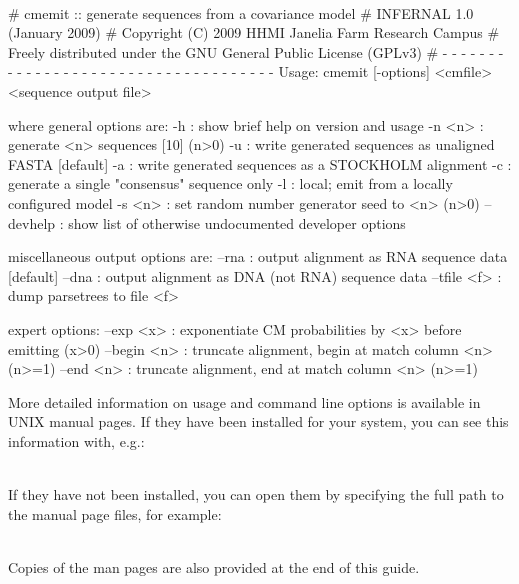 \\

\begin{sreoutput}
# cmemit :: generate sequences from a covariance model
# INFERNAL 1.0 (January 2009)
# Copyright (C) 2009 HHMI Janelia Farm Research Campus
# Freely distributed under the GNU General Public License (GPLv3)
# - - - - - - - - - - - - - - - - - - - - - - - - - - - - - - - - - - - -
Usage: cmemit [-options] <cmfile> <sequence output file>

where general options are:
  -h        : show brief help on version and usage
  -n <n>    : generate <n> sequences  [10]  (n>0)
  -u        : write generated sequences as unaligned FASTA  [default]
  -a        : write generated sequences as a STOCKHOLM alignment
  -c        : generate a single "consensus" sequence only
  -l        : local; emit from a locally configured model
  -s <n>    : set random number generator seed to <n>  (n>0)
  --devhelp : show list of otherwise undocumented developer options

miscellaneous output options are:
  --rna       : output alignment as RNA sequence data  [default]
  --dna       : output alignment as DNA (not RNA) sequence data
  --tfile <f> : dump parsetrees to file <f>

expert options:
  --exp <x>   : exponentiate CM probabilities by <x> before emitting  (x>0)
  --begin <n> : truncate alignment, begin at match column <n>  (n>=1)
  --end <n>   : truncate alignment,   end at match column <n>  (n>=1)
\end{sreoutput}

More detailed information on usage and command line options is
available in UNIX manual pages. If they have been installed for your
system, you can see this information with, e.g.:

\\

If they have not been installed, you can open them by specifying the
full path to the manual page files, for example:

\\

Copies of the man pages are also provided at the end of this guide.


